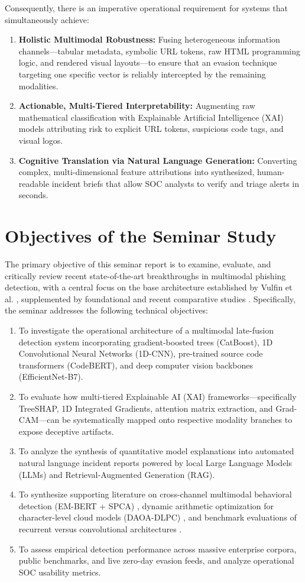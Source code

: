 Consequently, there is an imperative operational requirement for systems that simultaneously achieve:
\begin{enumerate}
\item \textbf{Holistic Multimodal Robustness:} Fusing heterogeneous information channels---tabular metadata, symbolic URL tokens, raw HTML programming logic, and rendered visual layouts---to ensure that an evasion technique targeting one specific vector is reliably intercepted by the remaining modalities.
\item \textbf{Actionable, Multi-Tiered Interpretability:} Augmenting raw mathematical classification with Explainable Artificial Intelligence (XAI) models attributing risk to explicit URL tokens, suspicious code tags, and visual logos.
\item \textbf{Cognitive Translation via Natural Language Generation:} Converting complex, multi-dimensional feature attributions into synthesized, human-readable incident briefs that allow SOC analysts to verify and triage alerts in seconds.
\end{enumerate}

\section{Objectives of the Seminar Study}
The primary objective of this seminar report is to examine, evaluate, and critically review recent state-of-the-art breakthroughs in multimodal phishing detection, with a central focus on the base architecture established by Vulfin et al. \cite{1}, supplemented by foundational and recent comparative studies \cite{2,3,4,5}. Specifically, the seminar addresses the following technical objectives:
\begin{enumerate}
\item To investigate the operational architecture of a multimodal late-fusion detection system incorporating gradient-boosted trees (CatBoost), 1D Convolutional Neural Networks (1D-CNN), pre-trained source code transformers (CodeBERT), and deep computer vision backbones (EfficientNet-B7).
\item To evaluate how multi-tiered Explainable AI (XAI) frameworks---specifically TreeSHAP, 1D Integrated Gradients, attention matrix extraction, and Grad-CAM---can be systematically mapped onto respective modality branches to expose deceptive artifacts.
\item To analyze the synthesis of quantitative model explanations into automated natural language incident reports powered by local Large Language Models (LLMs) and Retrieval-Augmented Generation (RAG).
\item To synthesize supporting literature on cross-channel multimodal behavioral detection (EM-BERT + SPCA) \cite{2}, dynamic arithmetic optimization for character-level cloud models (DAOA-DLPC) \cite{3}, and benchmark evaluations of recurrent versus convolutional architectures \cite{4}.
\item To assess empirical detection performance across massive enterprise corpora, public benchmarks, and live zero-day evasion feeds, and analyze operational SOC usability metrics.
\end{enumerate}

